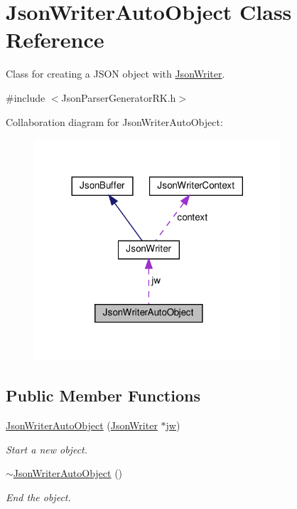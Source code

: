 \hypertarget{class_json_writer_auto_object}{}\section{Json\+Writer\+Auto\+Object Class Reference}
\label{class_json_writer_auto_object}


Class for creating a J\+S\+ON object with \hyperlink{class_json_writer}{Json\+Writer}.  




{\ttfamily \#include $<$Json\+Parser\+Generator\+R\+K.\+h$>$}



Collaboration diagram for Json\+Writer\+Auto\+Object\+:
\nopagebreak
\begin{figure}[H]
\begin{center}
\leavevmode
\includegraphics[width=260pt]{class_json_writer_auto_object__coll__graph}
\end{center}
\end{figure}
\subsection*{Public Member Functions}
\begin{DoxyCompactItemize}
\item 
\hyperlink{class_json_writer_auto_object_a92e7cbe4161ff0bd184791e1d666e95f}{Json\+Writer\+Auto\+Object} (\hyperlink{class_json_writer}{Json\+Writer} $\ast$\hyperlink{class_json_writer_auto_object_a4ffea7af57b2ceb87edd5e7ee08aeefb}{jw})
\begin{DoxyCompactList}\small\item\em Start a new object. \end{DoxyCompactList}\item 
\hyperlink{class_json_writer_auto_object_adb79acd280cd69ae5d0d6afea1c187bc}{$\sim$\+Json\+Writer\+Auto\+Object} ()
\begin{DoxyCompactList}\small\item\em End the object. \end{DoxyCompactList}\end{DoxyCompactItemize}

